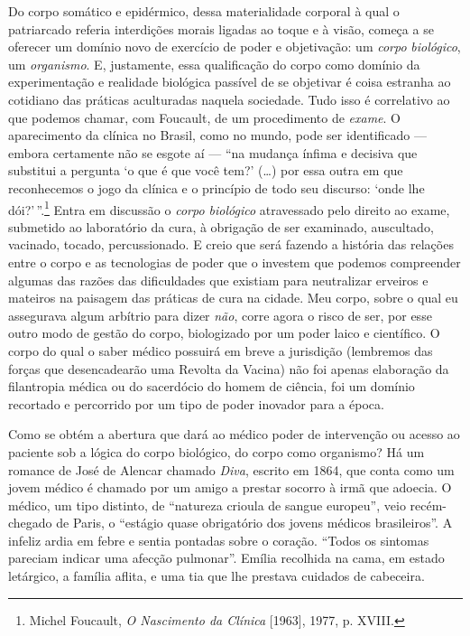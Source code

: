 Do corpo somático e epidérmico, dessa materialidade corporal à qual o
patriarcado referia interdições morais ligadas ao toque e à visão,
começa a se oferecer um domínio novo de exercício de poder e
objetivação: um \textit{corpo} \textit{biológico}, um \textit{organismo}. E,
justamente, essa qualificação do corpo como domínio da experimentação e
realidade biológica passível de se objetivar é coisa estranha ao
cotidiano das práticas aculturadas naquela sociedade. Tudo isso é
correlativo ao que podemos chamar, com Foucault, de um procedimento de
\textit{exame}. O aparecimento da clínica no Brasil, como no mundo, pode
ser identificado --- embora certamente não se esgote aí --- ``na mudança
ínfima e decisiva que substitui a pergunta `o que é que você tem?'
(\ldots{}) por essa outra em que reconhecemos o jogo da clínica e o
princípio de todo seu discurso: `onde lhe dói?'\,''.\footnote{Michel
  Foucault, \textit{O Nascimento da Clínica} {[}1963{]}, 1977, p. XVIII.}
Entra em discussão o \textit{corpo biológico} atravessado pelo direito ao
exame, submetido ao laboratório da cura, à obrigação de ser examinado,
auscultado, vacinado, tocado, percussionado. E creio que será fazendo a
história das relações entre o corpo e as tecnologias de poder que o
investem que podemos compreender algumas das razões das dificuldades que
existiam para neutralizar erveiros e mateiros na paisagem das práticas
de cura na cidade. Meu corpo, sobre o qual eu assegurava algum arbítrio
para dizer \textit{não}, corre agora o risco de ser, por esse outro modo
de gestão do corpo, biologizado por um poder laico e científico. O corpo
do qual o saber médico possuirá em breve a jurisdição (lembremos das
forças que desencadearão uma Revolta da Vacina) não foi apenas
elaboração da filantropia médica ou do sacerdócio do homem de ciência,
foi um domínio recortado e percorrido por um tipo de poder inovador para
a época.

Como se obtém a abertura que dará ao médico poder de intervenção ou
acesso ao paciente sob a lógica do corpo biológico, do corpo como
organismo? Há um romance de José de Alencar chamado \textit{Diva}, escrito
em 1864, que conta como um jovem médico é chamado por um amigo a prestar
socorro à irmã que adoecia. O médico, um tipo distinto, de ``natureza
crioula de sangue europeu'', veio recém-chegado de Paris, o ``estágio
quase obrigatório dos jovens médicos brasileiros''. A infeliz ardia em
febre e sentia pontadas sobre o coração. ``Todos os sintomas pareciam
indicar uma afecção pulmonar''. Emília recolhida na cama, em estado
letárgico, a família aflita, e uma tia que lhe prestava cuidados de
cabeceira.

